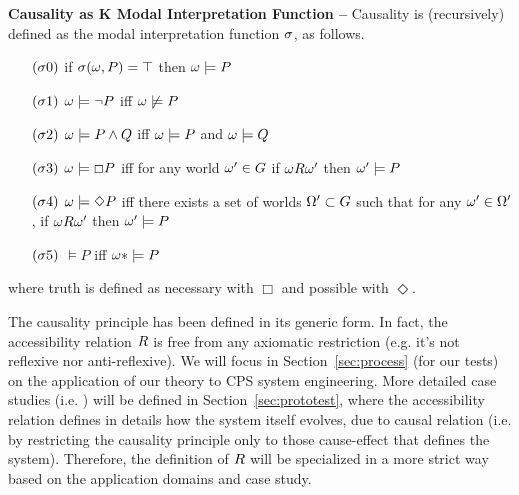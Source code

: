 \begin{definition}{\bf Causality as K Modal Interpretation Function --}\label{def:modalinterpretation}
	Causality is (recursively) defined as the modal interpretation function $\sigma$, as follows. 
	\begin{enumerate}[noitemsep]
		\item[$(\sigma0)$] if $\sigma(\omega,P)=\top$ then $\omega\models P$
		\item[$(\sigma1)$] $\omega\models\neg P$ iff $\omega\not\models P$
		\item[$(\sigma2)$] $\omega\models P \wedge Q$ iff $\omega\models P$ and $\omega\models Q$
		\item[$(\sigma3)$] $\omega\models\Box P$ iff for any world $\omega'\in G$ if $\omega R\omega'$ then $\omega'\models P$
		\item[$(\sigma4)$] $\omega\models\Diamond P$ iff there exists a set of worlds $\Omega'\subset G$ such that for any $\omega'\in\Omega'$, if $\omega R\omega'$ then $\omega'\models P$
		\item[$(\sigma5)$] $\models P$ iff $\omega*\models P$
	\end{enumerate}
	where truth is defined as necessary with $\Box$ and possible with $\Diamond$.
\end{definition}


The causality principle has been defined in its
generic form. In fact, the accessibility relation $R$ is free from
any axiomatic restriction (e.g. it's not reflexive nor anti-reflexive).  
We will focus in Section~\ref{sec:process} (for our tests) on 
the application of our theory to CPS system engineering.
More detailed case studies (i.e. ) 
will be defined in Section~\ref{sec:prototest}, where
the accessibility relation defines in details how the system itself evolves, due to causal relation 
(i.e. by restricting the causality principle only to those cause-effect that defines
the system). Therefore, the definition of $R$
will be specialized in a more strict way based on the application domains and case study.

